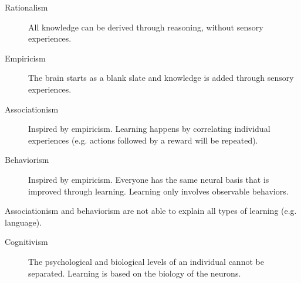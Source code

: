 \begin{description}
    \item[Rationalism] 
        All knowledge can be derived through reasoning, without sensory experiences.

    \item[Empiricism] 
        The brain starts as a blank slate and knowledge is added through sensory experiences.

    \item[Associationism] 
        Inspired by empiricism.
        Learning happens by correlating individual experiences (e.g. actions followed by a reward will be repeated).

    \item[Behaviorism] 
        Inspired by empiricism. 
        Everyone has the same neural basis that is improved through learning.
        Learning only involves observable behaviors.
\end{description}

\begin{remark}
    Associationism and behaviorism are not able to explain all types of learning (e.g. language).
\end{remark}

\begin{description}
    \item[Cognitivism] 
        The psychological and biological levels of an individual cannot be separated.
        Learning is based on the biology of the neurons.
\end{description}